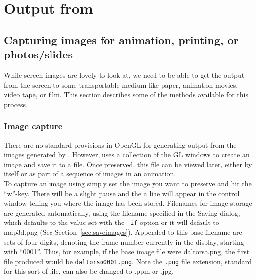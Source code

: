 \section{Output from \map{}}

\subsection{Capturing images for animation, printing, or photos/slides}
\label{sec:output} 

While screen images are lovely to look at, we need to be able to get the
output from the screen to some transportable medium like paper, animation
movies, video tape, or film.  This section describes some of the methods
available for this process.

\subsubsection{Image capture}
\label{sec:capture}
 
There are no standard provisions in OpenGL for generating output from the
images generated by \map{}.  However, \map{} uses a collection of the GL
windows to create an image and save it to a file.  Once preserved,
this file can be viewed later, either by itself or as part of a sequence of
images in an animation. \\

To capture an image using \map{} simply set the image you want to preserve
and hit the ``w''-key. There will be a slight pause and the a line will 
appear in the control window
telling you where the image has been stored.  Filenames for image storage
are generated automatically, using the filename specified in the Saving dialog,
which defaults to the value set with the {\tt -if} option or it will default 
to map3d.png (See Section~\ref{sec:saveimages}).  Appended to this base filename
are sets of four digits, denoting the frame number currently in
the display, starting with ``0001''.  Thus, for
example, if the base image file were daltorso.png, the first file
produced would be {\tt daltorso0001.png}.  Note the {\tt .png} file
extension, standard for this sort of file, can also be changed to .ppm or 
.jpg. \\

